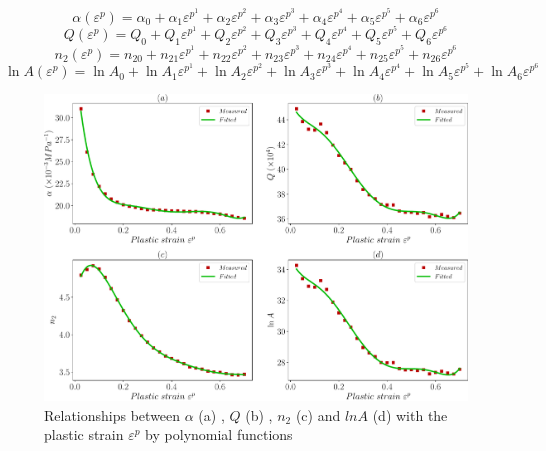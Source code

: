 \documentclass[twoside,english,1p,final,sort&compress]{elsarticle}
\theoremstyle{plain}
\begin{document}
\begin{equation}
\label{eq:alpha}
\alpha(\varepsilon^p) = \alpha_0 + \alpha_1\varepsilon^{{p^1}} + \alpha_2\varepsilon^{p^2} + \alpha_3\varepsilon^{p^3} + \alpha_4\varepsilon^{p^4} + \alpha_5\varepsilon^{p^5} + \alpha_6\varepsilon^{p^6}
\end{equation}
\begin{equation}
\label{eq:Q}
Q(\varepsilon^p) = Q_0 + Q_1\varepsilon^{{p^1}} + Q_2\varepsilon^{p^2} + Q_3\varepsilon^{p^3} + Q_4\varepsilon^{p^4} + Q_5\varepsilon^{p^5} + Q_6\varepsilon^{p^6}
\end{equation}
\begin{equation}
\label{eq:n}
n_2(\varepsilon^p) = n_{20} + n_{21}\varepsilon^{{p^1}} + n_{22}\varepsilon^{p^2} + n_{23}\varepsilon^{p^3} + n_{24}\varepsilon^{p^4} + n_{25}\varepsilon^{p^5} + n_{26}\varepsilon^{p^6}
\end{equation}
\begin{equation}
\label{eq:lnA}
\ln A(\varepsilon^p) = \ln A_0 + \ln A_1\varepsilon^{{p^1}} + \ln A_2\varepsilon^{p^2} + \ln A_3\varepsilon^{p^3} + \ln A_4\varepsilon^{p^4} + \ln A_5\varepsilon^{p^5} + \ln A_6\varepsilon^{p^6}
\end{equation}
\begin{figure}[!ht]
\centering
\includegraphics[width=1.02\columnwidth]{newFigures/ARparameters}
\caption{Relationships between $\alpha$ (a)  , $Q$ (b) , $n_2$ (c)  and $lnA$ (d)  with the plastic strain $\varepsilon^p$ by polynomial functions}
\label{fig:ARparameters}
\end{figure}
\end{document}
